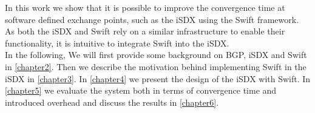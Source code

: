 In this work we show that it is possible to improve the convergence time at software defined exchange points, such as the iSDX using the Swift framework. As both the iSDX and Swift rely on a similar infrastructure to enable their functionality, it is intuitive to integrate Swift into the iSDX. \\

In the following, We will first provide some background on BGP, iSDX and Swift in \ref{chapter2}. Then we describe the motivation behind implementing Swift in the iSDX in \ref{chapter3}. In \ref{chapter4} we present the design of the iSDX with Swift. In \ref{chapter5} we evaluate the system both in terms of convergence time and introduced overhead and discuss the results in \ref{chapter6}. 



